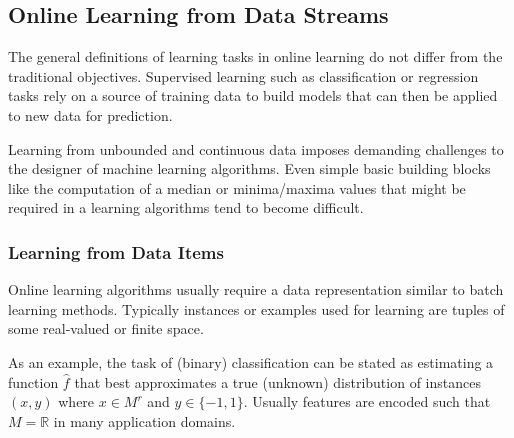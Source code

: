 


\subsection{\label{sec:onlineLearning}Online Learning from Data Streams}
The general definitions of learning tasks in online learning do not
differ from the traditional objectives. Supervised learning such as
classification or regression tasks rely on a source of training data
to build models that can then be applied to new data for prediction.

Learning from unbounded and continuous data imposes demanding challenges to
the designer of machine learning algorithms. Even simple basic
building blocks like the computation of a median or minima/maxima
values that might be required in a learning algorithms tend to become
difficult.

\subsubsection{\label{sec:dataExamples}Learning from Data Items}
Online learning algorithms usually require a data representation
similar to batch learning methods. Typically instances or examples
used for learning are tuples of some real-valued or finite space.

As an example, the task of (binary) classification can be stated as
estimating a function $\hat{f}$ that best approximates a true
(unknown) distribution of instances $(x,y)$ where $x\in M^r$ and $y
\in \{ -1,1 \}$. Usually features are encoded such that $M=\mathbb{R}$
in many application domains.

